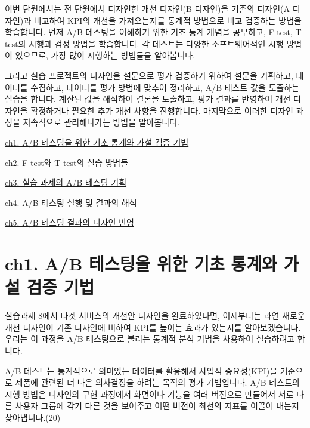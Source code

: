 \documentclass[
  letterpaper,
]{book}
\begin{document}
이번 단원에서는 전 단원에서 디자인한 개선 디자인(B 디자인)을 기존의
디자인(A 디자인)과 비교하여 KPI의 개선을 가져오는지를 통계적 방법으로
비교 검증하는 방법을 학습합니다. 먼저 A/B 테스팅을 이해하기 위한 기초
통계 개념을 공부하고, F-test, T-test의 시행과 검정 방법을 학습합니다. 각
테스트는 다양한 소프트웨어적인 시행 방법이 있으므로, 가장 많이 시행하는
방법들을 알아봅니다.

그리고 실습 프로젝트의 디자인을 설문으로 평가 검증하기 위하여 설문을
기획하고, 데이터를 수집하고, 데이터를 평가 방법에 맞추어 정리하고, A/B
테스트 값을 도출하는 실습을 합니다. 계산된 값을 해석하여 결론을
도출하고, 평가 결과를 반영하여 개선 디자인을 확정하거나 필요한 추가 개선
사항을 진행합니다. 마지막으로 이러한 디자인 과정을 지속적으로
관리해나가는 방법을 알아봅니다.

\href{ch1.\%20AB\%20테스팅을\%20위한\%20기초\%20통계와\%20가설\%20검증\%20기법.qmd}{ch1.
A/B 테스팅을 위한 기초 통계와 가설 검증 기법}

\href{ch2.\%20F-test와\%20T-test의\%20실습\%20방법들.qmd}{ch2. F-test와
T-test의 실습 방법들}

\href{ch3.\%20실습\%20과제의\%20AB\%20테스팅\%20기획.qmd}{ch3. 실습
과제의 A/B 테스팅 기획}

\href{ch4.\%20AB\%20테스팅\%20실행\%20및\%20결과의\%20해석.qmd}{ch4. A/B
테스팅 실행 및 결과의 해석}

\href{ch5.\%20AB\%20테스팅\%20결과의\%20디자인\%20반영.qmd}{ch5. A/B
테스팅 결과의 디자인 반영}

\chapter{ch1. A/B 테스팅을 위한 기초 통계와 가설 검증
기법}\label{ch1.-ab-uxd14cuxc2a4uxd305uxc744-uxc704uxd55c-uxae30uxcd08-uxd1b5uxacc4uxc640-uxac00uxc124-uxac80uxc99d-uxae30uxbc95}

실습과제 8에서 타겟 서비스의 개선안 디자인을 완료하였다면, 이제부터는
과연 새로운 개선 디자인이 기존 디자인에 비하여 KPI를 높이는 효과가
있는지를 알아보겠습니다. 우리는 이 과정을 A/B 테스팅으로 불리는 통계적
분석 기법을 사용하여 실습하려고 합니다.

A/B 테스트는 통계적으로 의미있는 데이터를 활용해서 사업적 중요성(KPI)을
기준으로 제품에 관련된 더 나은 의사결정을 하려는 목적의 평가 기법입니다.
A/B 테스트의 시행 방법은 디자인의 구현 과정에서 화면이나 기능을 여러
버전으로 만들어서 서로 다른 사용자 그룹에 각기 다른 것을 보여주고 어떤
버전이 최선의 지표를 이끌어 내는지 찾아냅니다.(20)
\end{document}
